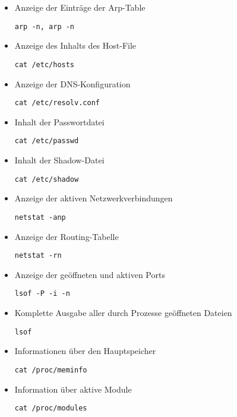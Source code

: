 \begin{itemize}
\item  Anzeige der Einträge der Arp-Table
\begin{lstlisting}
arp -n, arp -n
\end{lstlisting}

\item  Anzeige des Inhalts des Host-File
\begin{lstlisting}
cat /etc/hosts
\end{lstlisting}

\item  Anzeige der DNS-Konfiguration
\begin{lstlisting}
cat /etc/resolv.conf
\end{lstlisting}

\item  Inhalt der Passwortdatei
\begin{lstlisting}
cat /etc/passwd
\end{lstlisting}

\item  Inhalt der Shadow-Datei
\begin{lstlisting}
cat /etc/shadow
\end{lstlisting}

\item  Anzeige der aktiven Netzwerkverbindungen
\begin{lstlisting}
netstat -anp
\end{lstlisting}

\item  Anzeige der Routing-Tabelle
\begin{lstlisting}
netstat -rn
\end{lstlisting}

\item Anzeige der geöffneten und aktiven Ports 
\begin{lstlisting}
lsof -P -i -n
\end{lstlisting}

\item  Komplette Ausgabe aller durch Prozesse geöffneten Dateien
\begin{lstlisting}
lsof
\end{lstlisting}

\item  Informationen über den Hauptspeicher
\begin{lstlisting}
cat /proc/meminfo
\end{lstlisting}

\item  Information über aktive Module
\begin{lstlisting}
cat /proc/modules
\end{lstlisting}


\end{itemize}
